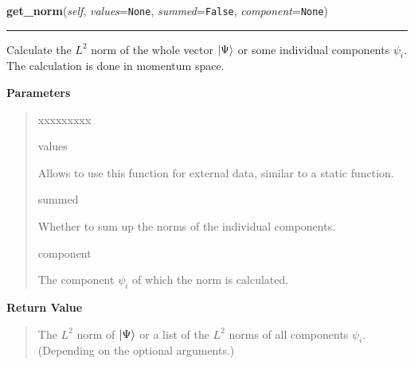 \hspace{.8\funcindent}\begin{boxedminipage}{\funcwidth}

    \raggedright \textbf{get\_norm}(\textit{self}, \textit{values}={\tt None}, \textit{summed}={\tt False}, \textit{component}={\tt None})

    \vspace{-1.5ex}

    \rule{\textwidth}{0.5\fboxrule}
\setlength{\parskip}{2ex}
    Calculate the $L^2$ norm of the whole vector
    $\Ket{\Psi}$ or some individual
    components $\psi_i$. The calculation is done in
    momentum space.

\setlength{\parskip}{1ex}
      \textbf{Parameters}
      \vspace{-1ex}

      \begin{quote}
        \begin{Ventry}{xxxxxxxxx}

          \item[values]

          Allows to use this function for external data, similar to a
          static function.

          \item[summed]

          Whether to sum up the norms of the individual components.

          \item[component]

          The component $\psi_i$ of which the norm is
          calculated.

        \end{Ventry}

      \end{quote}

      \textbf{Return Value}
    \vspace{-1ex}

      \begin{quote}
      The $L^2$ norm of
      $\Ket{\Psi}$ or a list of the
      $L^2$ norms of all components $\psi_i$. (Depending on the
      optional arguments.)

      \end{quote}

    \end{boxedminipage}

    \label{WaveFunction:WaveFunction:kinetic_energy}

